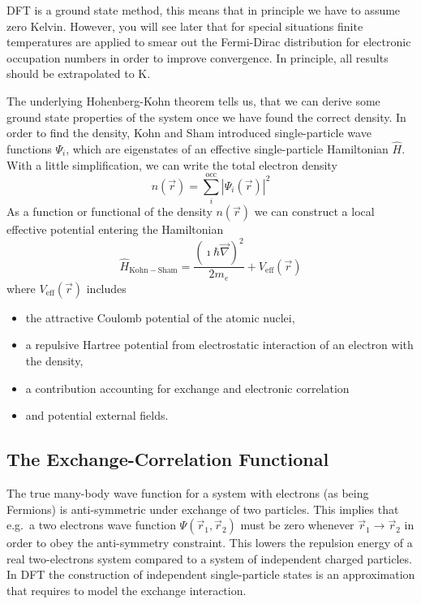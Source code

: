 \documentclass[oribibl]{llncs}
\newcommand{\um}[1]{_{\mathrm{#1}}}
\begin{document}
\ac{DFT} is a ground state method, this means that in principle we have to
assume zero Kelvin. However, you will see later that for special situations 
finite temperatures are applied to smear out the Fermi-Dirac distribution 
for electronic occupation numbers in order to improve convergence.
In principle, all results should be extrapolated to \unit[0]{K}.


The underlying Hohenberg-Kohn theorem tells us, that we can derive some 
ground state properties of the system once we have found the correct density.
In order to find the density, Kohn and Sham introduced single-particle wave functions $\Psi_i$, which are eigenstates of an effective single-particle Hamiltonian $\hat H$.
With a little simplification, we can write the total electron density
\begin{equation}
	n(\vec r) = \sum_i^{\mathrm{occ}} \left| \Psi_i(\vec r) \right|^2
	\label{eqn:simplified_density_generation}
\end{equation} 
As a function or functional of the density $n(\vec r)$ we can construct
a local effective potential entering the Hamiltonian
\begin{equation}
	\hat H\um{Kohn-Sham} = \frac{\left( \imath \hbar \vec \nabla \right)^2}{2 m_e} + V\um{eff}(\vec r)
	\label{eqn:Kohn-Sham_Hamiltonian_no_spin}
\end{equation} 
where $V\um{eff}(\vec r)$ includes
\begin{itemize}
  \item the attractive Coulomb potential of the atomic nuclei,
  \item a repulsive Hartree potential from electrostatic 
  		interaction of an electron with the density,
  \item a contribution accounting for exchange and electronic correlation
  \item and potential external fields.
\end{itemize}

\subsection{The Exchange-Correlation Functional}
The true many-body wave function for a system with electrons (as being Fermions)
is anti-symmetric under exchange of two particles. 
This implies that e.g.~a two electrons wave function $\Psi(\vec r_1,\vec r_2)$ must be zero whenever $\vec r_1 \rightarrow \vec r_2$ in order to obey
the anti-symmetry constraint.
This lowers the repulsion energy of a real two-electrons system compared to a
system of independent charged particles.
In \ac{DFT} the construction of independent single-particle states is an approximation that requires to model the exchange interaction.
\end{document}
